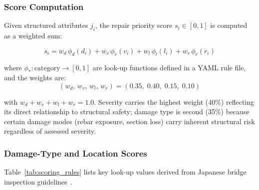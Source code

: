 \documentclass[twocolumn]{article}
\begin{document}
\subsubsection{Score Computation}

Given structured attributes $j_i$, the repair priority score
$s_i \in [0, 1]$ is computed as a weighted sum:

\begin{equation}
  s_i = w_d\,\phi_d(d_i) + w_v\,\phi_v(v_i) + w_l\,\phi_l(l_i) + w_r\,\phi_r(r_i)
  \label{eq:score}
\end{equation}

where $\phi_*: \text{category} \to [0,1]$ are look-up functions defined in
a YAML rule file, and the weights are:
\begin{equation}
  (w_d,\, w_v,\, w_l,\, w_r) = (0.35,\; 0.40,\; 0.15,\; 0.10)
  \label{eq:weights}
\end{equation}

with $w_d + w_v + w_l + w_r = 1.0$.
Severity carries the highest weight (40\%) reflecting its direct relationship
to structural safety; damage type is second (35\%) because certain damage modes
(rebar exposure, section loss) carry inherent structural risk regardless of
assessed severity.

\subsubsection{Damage-Type and Location Scores}

Table~\ref{tab:scoring_rules} lists key look-up values derived from
Japanese bridge inspection guidelines~\cite{mlit2023bridge}.
\end{document}
